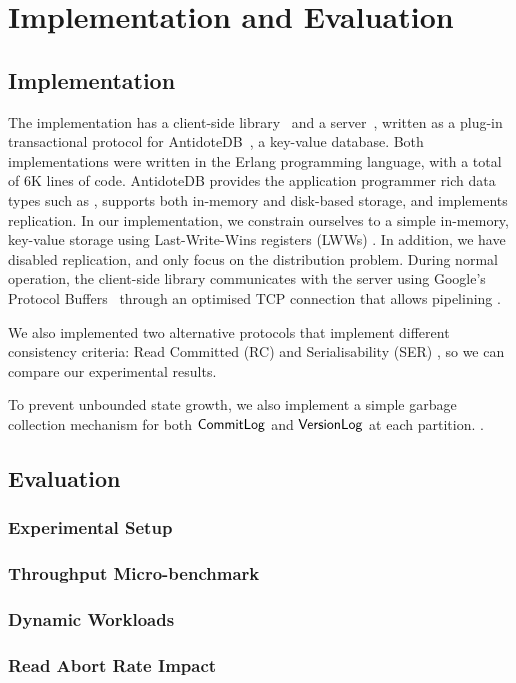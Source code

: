 \cleardoublepage
\chapter{Implementation and Evaluation}
\label{eval_chapter}

\section{Implementation}

The  implementation has a client-side library~\citep{pvc-client} and a server~\citep{pvc-server}, written as a plug-in transactional protocol for AntidoteDB~\citep{antidote-db}, a key-value database. Both implementations were written in the Erlang programming language, with a total of 6K lines of code. AntidoteDB provides the application programmer rich data types such as , supports both in-memory and disk-based storage, and implements  replication. In our implementation, we constrain ourselves to a simple in-memory, key-value storage using Last-Write-Wins registers (LWWs) . In addition, we have disabled replication, and only focus on the distribution problem. During normal operation, the client-side library communicates with the server using Google's Protocol Buffers~\citep{protobuf} through an optimised TCP connection that allows pipelining .

We also implemented two alternative protocols that implement different consistency criteria: Read Committed (RC) and Serialisability (SER) , so we can compare our experimental results.

To prevent unbounded state growth, we also implement a simple garbage collection mechanism for both $\mathsf{CommitLog}$ and $\mathsf{VersionLog}$ at each partition. .

\section{Evaluation}


\subsection{Experimental Setup}

\subsection{Throughput Micro-benchmark}

\subsection{Dynamic Workloads}

\subsection{Read Abort Rate Impact}

